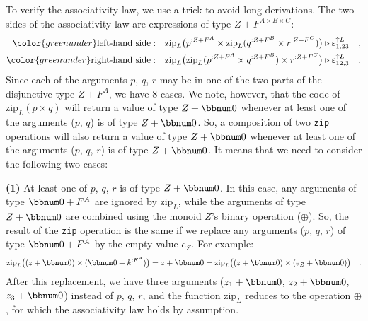 To verify the associativity law, we use a trick to avoid long derivations.
The two sides of the associativity law are expressions of type $Z+F^{A\times B\times C}$:
\begin{align*}
{\color{greenunder}\text{left-hand side}:}\quad & \text{zip}_{L}\big(p^{:Z+F^{A}}\times\text{zip}_{L}(q^{:Z+F^{B}}\times r^{:Z+F^{C}})\big)\triangleright\varepsilon_{1,23}^{\uparrow L}\quad,\\
{\color{greenunder}\text{right-hand side}:}\quad & \text{zip}_{L}\big(\text{zip}_{L}(p^{:Z+F^{A}}\times q^{:Z+F^{B}})\times r^{:Z+F^{C}}\big)\triangleright\varepsilon_{12,3}^{\uparrow L}\quad.
\end{align*}
Since each of the arguments $p$, $q$, $r$ may be in one of the
two parts of the disjunctive type $Z+F^{A}$, we have 8 cases. We
note, however, that the code of $\text{zip}_{L}(p\times q)$ will
return a value of type $Z+\bbnum 0$ whenever at least one of the
arguments ($p$, $q$) is of type $Z+\bbnum 0$. So, a composition
of two \lstinline!zip! operations will also return a value of type
$Z+\bbnum 0$ whenever at least one of the arguments ($p$, $q$,
$r$) is of type $Z+\bbnum 0$. It means that we need to consider
the following two cases: 

\textbf{(1)} At least one of $p$, $q$, $r$ is of type $Z+\bbnum 0$.
In this case, any arguments of type $\bbnum 0+F^{A}$ are ignored
by $\text{zip}_{L}$, while the arguments of type $Z+\bbnum 0$ are
combined using the monoid $Z$\textsf{'}s binary operation ($\oplus$). So,
the result of the \lstinline!zip! operation is the same if we replace
any arguments ($p$, $q$, $r$) of type $\bbnum 0+F^{A}$ by the
empty value $e_{Z}$. For example:
\[
\text{zip}_{L}\big((z+\bbnum 0)\times(\bbnum 0+k^{:F^{A}})\big)=z+\bbnum 0=\text{zip}_{L}\big((z+\bbnum 0)\times(e_{Z}+\bbnum 0)\big)\quad.
\]
After this replacement, we have three arguments ($z_{1}+\bbnum 0$,
$z_{2}+\bbnum 0$, $z_{3}+\bbnum 0$) instead of $p$, $q$, $r$,
and the function $\text{zip}_{L}$ reduces to the operation $\oplus$,
for which the associativity law holds by assumption.%
\begin{comment}
 do we need this?
\begin{align*}
 & \text{zip}_{L}\big(p\times\text{zip}_{L}(q\times r)\big)\triangleright\varepsilon_{1,23}^{\uparrow L}=\big((z_{1}\oplus z_{2}\oplus z_{3})+\bbnum 0\big)\triangleright\varepsilon_{1,23}^{\uparrow L}=(z_{1}\oplus z_{2}\oplus z_{3})+\bbnum 0\quad,\\
 & \text{zip}_{L}\big(\text{zip}_{L}(p\times q)\times r\big)\triangleright\varepsilon_{12,3}^{\uparrow L}=\big((z_{1}\oplus z_{2}\oplus z_{3})+\bbnum 0\big)\triangleright\varepsilon_{12,3}^{\uparrow L}=(z_{1}\oplus z_{2}\oplus z_{3})+\bbnum 0\quad.
\end{align*}
\end{comment}

